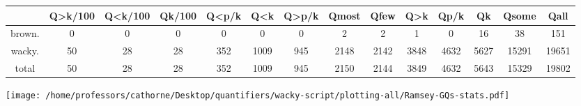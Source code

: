 \documentclass[a4,10pt]{article}
\begin{document}
\begin{sidewaystable}[p]
\tiny{\begin{tabular}{|c|c|c|c|c|c|c|c|c|c|c|c|c|c|}
 & Q>k/100 & Q<k/100 & Qk/100 & Q<p/k & Q<k & Q>p/k & Qmost & Qfew & Q>k & Qp/k & Qk & Qsome & Qall\\
\hline
brown. & 0 & 0 & 0 & 0 & 0 & 0 & 2 & 2 & 1 & 0 & 16 & 38 & 151\\
wacky. & 50 & 28 & 28 & 352 & 1009 & 945 & 2148 & 2142 & 3848 & 4632 & 5627 & 15291 & 19651\\
\hline
total & 50 & 28 & 28 & 352 & 1009 & 945 & 2150 & 2144 & 3849 & 4632 & 5643 & 15329 & 19802
\end{tabular}}
\end{sidewaystable}



\vspace{0.2cm}

\begin{center}
\texttt{[image: /home/professors/cathorne/Desktop/quantifiers/wacky-script/plotting-all/Ramsey-GQs-stats.pdf]}
\end{center}
\end{document}
